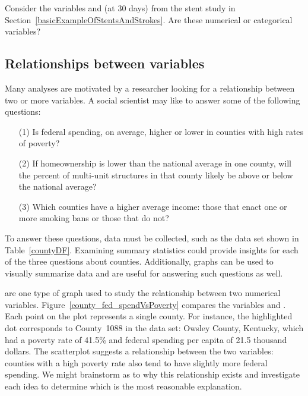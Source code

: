 \begin{exercisewrap}
\begin{nexercise} 
Consider the variables  and  (at 30 days) from the stent study in Section~\ref{basicExampleOfStentsAndStrokes}. Are these numerical or categorical variables?\footnotemark
\end{nexercise}
\end{exercisewrap}

\subsection{Relationships between variables}
\label{variableRelations}

Many analyses are motivated by a researcher looking for a relationship between two or more variables. A social scientist may like to answer some of the following questions:
\begin{enumerate}
\setlength{\itemsep}{0mm}
\item[(1)]\label{fedSpendingPovertyQuestion} Is federal spending, on average, higher or lower in counties with high rates of poverty?
\item[(2)]\label{ownershipMultiUnitQuestion} If homeownership is lower than the national average in one county, will the percent of multi-unit structures in that county likely be above or below the national average?
\item[(3)]\label{isAverageIncomeAssociatedWithSmokingBans} Which counties have a higher average income: those that enact one or more smoking bans or those that do not?
\end{enumerate}

To answer these questions, data must be collected, such as the  data set shown in Table~\ref{countyDF}. Examining summary statistics  could provide insights for each of the three questions about counties. Additionally, graphs can be used to visually summarize data and are useful for answering such questions as well.

 are one type of graph used to study the relationship between two numerical variables. Figure~\ref{county_fed_spendVsPoverty} compares the variables  and . Each point on the plot represents a single county. For instance, the highlighted dot corresponds to County~1088 in the  data set: Owsley County, Kentucky, which had a poverty rate of 41.5\% and federal spending per capita of 21.5 thousand dollars. The scatterplot suggests a relationship between the two variables: counties with a high poverty rate also tend to have slightly more federal spending. We might brainstorm as to why this relationship exists and investigate each idea to determine which is the most reasonable explanation.

